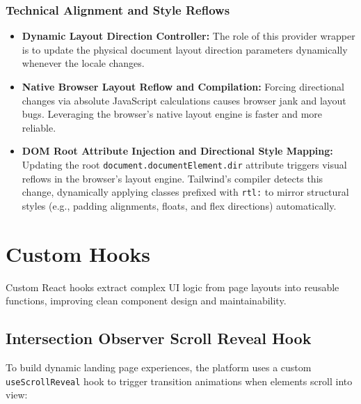 \documentclass[12pt,a4paper]{article}
\begin{document}
\subsubsection{Technical Alignment and Style Reflows}

\begin{itemize}[leftmargin=2em]
    \item \textbf{Dynamic Layout Direction Controller:} The role of this provider wrapper is to update the physical document layout direction parameters dynamically whenever the locale changes.
    \item \textbf{Native Browser Layout Reflow and Compilation:} Forcing directional changes via absolute JavaScript calculations causes browser jank and layout bugs. Leveraging the browser's native layout engine is faster and more reliable.
    \item \textbf{DOM Root Attribute Injection and Directional Style Mapping:} Updating the root \texttt{document.documentElement.dir} attribute triggers visual reflows in the browser's layout engine. Tailwind's compiler detects this change, dynamically applying classes prefixed with \texttt{rtl:} to mirror structural styles (e.g., padding alignments, floats, and flex directions) automatically.
\end{itemize}

\section{Custom Hooks}

Custom React hooks extract complex UI logic from page layouts into reusable functions, improving clean component design and maintainability.

\subsection{Intersection Observer Scroll Reveal Hook}

To build dynamic landing page experiences, the platform uses a custom \texttt{useScrollReveal} hook to trigger transition animations when elements scroll into view:
\end{document}
